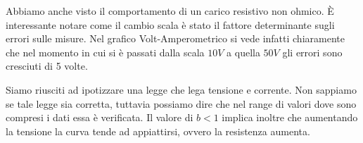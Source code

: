 Abbiamo anche visto il comportamento di un carico resistivo non ohmico. È interessante notare come il cambio scala è stato il fattore determinante sugli errori sulle misure. Nel grafico Volt-Amperometrico si vede infatti chiaramente che nel momento in cui si è passati dalla scala $10V$ a quella $50V$ gli errori sono cresciuti di 5 volte.
 
Siamo riusciti ad ipotizzare una legge che lega tensione e corrente. Non sappiamo se tale legge sia corretta, tuttavia possiamo dire che nel range di valori dove sono compresi i dati essa è verificata. Il valore di $b<1$ implica inoltre che aumentando la tensione la curva tende ad appiattirsi, ovvero la resistenza aumenta.